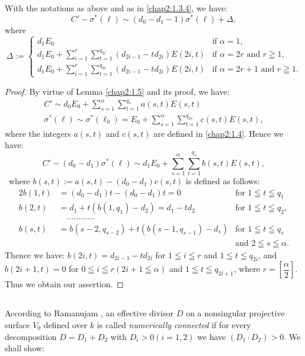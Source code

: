 \begin{lemma*}
With the notations as above and as in \ref{chap2:1.3.4}, we have:
$$
C'-\sigma^{\ast}(\ell)\sim (d_{0}-d_{1}-1)\sigma^{\ast}(\ell)+\Delta,
$$
where
$$
\Delta:=
\begin{cases}
d_{1}E_{0} & \text{if } \alpha =1,\\
d_{1}E_{0}+\sum^{r}_{i=1}\sum^{q_{2i}}_{t=1}(d_{2i-1}-td_{2i})E(2i,t)
& \text{if } \alpha=2r\text{ \  and \ }r\geqq 1,\\
d_{1}E_{0}+\sum^{r}_{i=1}\sum^{q_{2i}}_{t=1}(d_{2i-1}-td_{2i})E(2i,t)
& \text{if } \alpha=2r+1 \text{ \  and \ } r\geqq 1.
\end{cases}
$$
\end{lemma*}

\begin{proof}
By virtue of Lemma \ref{chap2:1.5} and its proof, we have:
\begin{gather*}
C'\sim d_{0}E_{0}+\sum^{\alpha}_{s=1}\sum^{q_{s}}_{t=1}a(s,t)E(s,t)\\
\sigma^{\ast}(\ell)\sim
\sigma^{\ast}(\ell_{0})=E_{0}+\sum^{\alpha}_{s=1}\sum^{q_{2s}}_{t=1}c(s,t)E(s,t), 
\end{gather*}
where the integers $a(s,t)$ and $c(s,t)$ are defined in
\ref{chap2:1.4}. Hence we have:
$$
C'-(d_{0}-d_{1})\sigma^{\ast}(\ell)\sim
d_{1}E_{0}+\sum^{\alpha}_{s=1}\sum^{q_{s}}_{t=1}b(s,t)E(s,t), 
$$\pageoriginale\
where $b(s,t):=a(s,t)-(d_{0}-d_{1})c(s,t)$ is defined as follows:
\begin{alignat*}{2}
b(1,t) &= (d_{0}-d_{1})t-(d_{0}-d_{1})t=0\qquad & \text{for } 1\leqq
t\leqq q_{1}\\
b(2,t) &= d_{1}+t(b(1,q_{1})-d_{2})=d_{1}-td_{2}  &\text{for } 1\leqq
t\leqq q_{2}, \\
 &\quad \ldots\ldots\ldots\ldots & \\
b(s,t) &= b(s-2,q_{s-2})+t(b(s-1,q_{s-1})-d_{s}) &\text{for } 1\leqq
t\leqq q_{s}\\ 
 & & \text{and } 2\leqq s\leqq \alpha.
\end{alignat*}
Thence we have: $b(2i,t)=d_{2i-1}-td_{2i}$ for $1\leqq i\leqq r$ and
$1\leqq t\leqq q_{2i}$, and $b(2i+1,t)=0$ for $0\leqq i\leqq
r(2i+1\leqq \alpha)$ and $1\leqq t\leqq q_{2i+1}$, where
$r=\left[\dfrac{\alpha}{2}\right]$. Thus we obtain our
assertion.
\end{proof}

\subsection{}\label{chap2:4.8}
According to Ramanujam \cite{46}, an effective divisor $D$ on a
nonsingular projective surface $V_{0}$ defined over $k$ is called {\em
  numerically connected} if for every decomposition $D=D_{1}+D_{2}$
with $D_{i}>0(i=1,2)$ we have $(D_{1}\cdot D_{2})>0$. We shall show:

